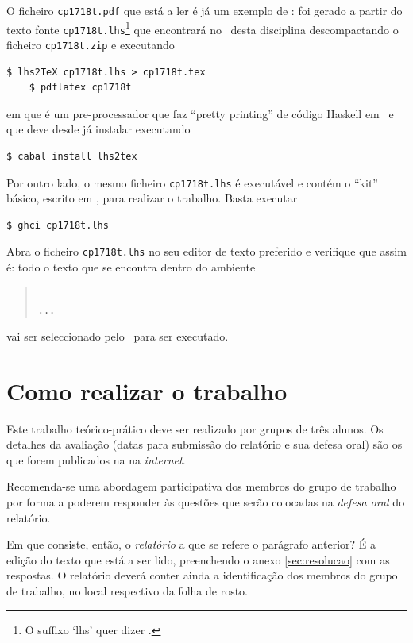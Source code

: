 \documentclass[a4paper]{article}
\begin{document}
O ficheiro \texttt{cp1718t.pdf} que está a ler é já um exemplo de : foi gerado a partir do texto fonte \texttt{cp1718t.lhs}\footnote{O
suffixo `lhs' quer dizer \emph{}.} que encontrará
no \MaterialPedagogico\ desta disciplina descompactando o ficheiro \texttt{cp1718t.zip}
e executando
\begin{Verbatim}[fontsize=\small]
    $ lhs2TeX cp1718t.lhs > cp1718t.tex
    $ pdflatex cp1718t
\end{Verbatim}
em que \href{https://hackage.haskell.org/package/lhs2tex}{\texttt\LhsToTeX} é
um pre-processador que faz ``pretty printing''
de código Haskell em \Latex\ e que deve desde já instalar executando
\begin{Verbatim}[fontsize=\small]
    $ cabal install lhs2tex
\end{Verbatim}
Por outro lado, o mesmo ficheiro \texttt{cp1718t.lhs} é executável e contém
o ``kit'' básico, escrito em \Haskell, para realizar o trabalho. Basta executar
\begin{Verbatim}[fontsize=\small]
    $ ghci cp1718t.lhs
\end{Verbatim}


\noindent Abra o ficheiro \texttt{cp1718t.lhs} no seu editor de texto preferido
e verifique que assim é: todo o texto que se encontra dentro do ambiente
\begin{quote}\small\tt
{}
\\ ... \\
\end{quote}
vai ser seleccionado pelo \GHCi\ para ser executado.

\section{Como realizar o trabalho}
Este trabalho teórico-prático deve ser realizado por grupos de três alunos.
Os detalhes da avaliação (datas para submissão do relatório e sua defesa
oral) são os que forem publicados na  na \emph{internet}.

Recomenda-se uma abordagem participativa dos membros do grupo
de trabalho por forma a poderem responder às questões que serão colocadas
na \emph{defesa oral} do relatório.

Em que consiste, então, o \emph{relatório} a que se refere o parágrafo anterior?
É a edição do texto que está a ser lido, preenchendo o anexo \ref{sec:resolucao}
com as respostas. O relatório deverá conter ainda a identificação dos membros
do grupo de trabalho, no local respectivo da folha de rosto.
\end{document}
